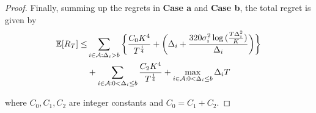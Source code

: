 \begin{proof}
Finally, summing up the regrets in \textbf{Case a} and \textbf{Case b}, the total regret is given by
\begin{align*}
\mathbb{E} [R_{T}] \leq &\sum\limits_{i\in \mathcal{A} :\Delta_{i} > b}\bigg\lbrace \dfrac{C_0 K^{4}}{T^{\frac{1}{4}}} + \bigg(\Delta_{i}+\dfrac{320\sigma_i^2\log{(\frac{T\Delta_{i}^{2}}{K})}}{\Delta_{i}}\bigg)\bigg \rbrace\\ 
  & +\sum\limits_{i\in \mathcal{A} :0 < \Delta_{i}\leq b} \dfrac{C_2 K^{4}}{T^{\frac{1}{4}}} + \max_{i\in \mathcal{A} :0 < \Delta_{i}\leq b}\Delta_{i}T
\end{align*}

where $C_0, C_1, C_2$ are integer constants and $C_0 = C_1 + C_2$.
\end{proof}


